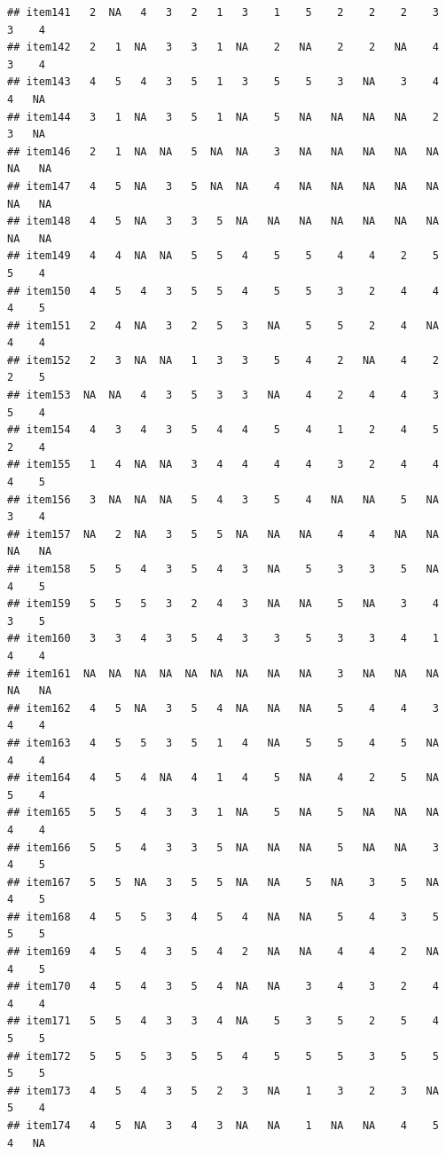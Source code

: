 \documentclass[
  man]{apa6}
\begin{document}
\begin{verbatim}
## item141   2  NA   4   3   2   1   3    1    5    2    2    2    3    3    4
## item142   2   1  NA   3   3   1  NA    2   NA    2    2   NA    4    3    4
## item143   4   5   4   3   5   1   3    5    5    3   NA    3    4    4   NA
## item144   3   1  NA   3   5   1  NA    5   NA   NA   NA   NA    2    3   NA
## item146   2   1  NA  NA   5  NA  NA    3   NA   NA   NA   NA   NA   NA   NA
## item147   4   5  NA   3   5  NA  NA    4   NA   NA   NA   NA   NA   NA   NA
## item148   4   5  NA   3   3   5  NA   NA   NA   NA   NA   NA   NA   NA   NA
## item149   4   4  NA  NA   5   5   4    5    5    4    4    2    5    5    4
## item150   4   5   4   3   5   5   4    5    5    3    2    4    4    4    5
## item151   2   4  NA   3   2   5   3   NA    5    5    2    4   NA    4    4
## item152   2   3  NA  NA   1   3   3    5    4    2   NA    4    2    2    5
## item153  NA  NA   4   3   5   3   3   NA    4    2    4    4    3    5    4
## item154   4   3   4   3   5   4   4    5    4    1    2    4    5    2    4
## item155   1   4  NA  NA   3   4   4    4    4    3    2    4    4    4    5
## item156   3  NA  NA  NA   5   4   3    5    4   NA   NA    5   NA    3    4
## item157  NA   2  NA   3   5   5  NA   NA   NA    4    4   NA   NA   NA   NA
## item158   5   5   4   3   5   4   3   NA    5    3    3    5   NA    4    5
## item159   5   5   5   3   2   4   3   NA   NA    5   NA    3    4    3    5
## item160   3   3   4   3   5   4   3    3    5    3    3    4    1    4    4
## item161  NA  NA  NA  NA  NA  NA  NA   NA   NA    3   NA   NA   NA   NA   NA
## item162   4   5  NA   3   5   4  NA   NA   NA    5    4    4    3    4    4
## item163   4   5   5   3   5   1   4   NA    5    5    4    5   NA    4    4
## item164   4   5   4  NA   4   1   4    5   NA    4    2    5   NA    5    4
## item165   5   5   4   3   3   1  NA    5   NA    5   NA   NA   NA    4    4
## item166   5   5   4   3   3   5  NA   NA   NA    5   NA   NA    3    4    5
## item167   5   5  NA   3   5   5  NA   NA    5   NA    3    5   NA    4    5
## item168   4   5   5   3   4   5   4   NA   NA    5    4    3    5    5    5
## item169   4   5   4   3   5   4   2   NA   NA    4    4    2   NA    4    5
## item170   4   5   4   3   5   4  NA   NA    3    4    3    2    4    4    4
## item171   5   5   4   3   3   4  NA    5    3    5    2    5    4    5    5
## item172   5   5   5   3   5   5   4    5    5    5    3    5    5    5    5
## item173   4   5   4   3   5   2   3   NA    1    3    2    3   NA    5    4
## item174   4   5  NA   3   4   3  NA   NA    1   NA   NA    4    5    4   NA

\end{verbatim}
\end{document}
